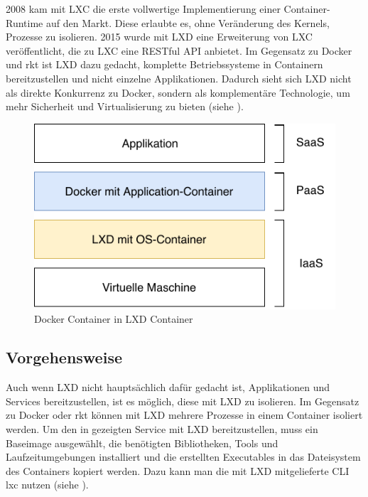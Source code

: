 2008 kam mit LXC die erste vollwertige Implementierung einer Container-Runtime auf den Markt. Diese erlaubte es, ohne Veränderung des Kernels, Prozesse zu isolieren. 2015 wurde mit LXD eine Erweiterung von LXC veröffentlicht, die zu LXC eine RESTful API anbietet. Im Gegensatz zu Docker und rkt ist LXD dazu gedacht, komplette Betriebssysteme in Containern bereitzustellen und nicht einzelne Applikationen. Dadurch sieht sich LXD nicht als direkte Konkurrenz zu Docker, sondern als komplementäre Technologie, um mehr Sicherheit und Virtualisierung zu bieten \citep{TheLXDContainerHypervisor} (siehe ).

\begin{figure}[h]
	\begin{center}
		\includegraphics[]{bilder/cloud-stack.pdf}
		\caption{Docker Container in LXD Container}
		\label{fig:cloudStack}		
	\end{center}
\end{figure}

\subsection{Vorgehensweise}
\label{sec:compLXDVorgehen}

Auch wenn LXD nicht hauptsächlich dafür gedacht ist, Applikationen und Services bereitzustellen, ist es möglich, diese mit LXD zu isolieren. Im Gegensatz zu Docker oder rkt können mit LXD mehrere Prozesse in einem Container isoliert werden. Um den in  gezeigten Service mit LXD bereitzustellen, muss ein Baseimage ausgewählt, die benötigten Bibliotheken, Tools und Laufzeitumgebungen installiert und die erstellten Executables in das Dateisystem des Containers kopiert werden. Dazu kann man die mit LXD mitgelieferte CLI lxc nutzen (siehe ).

